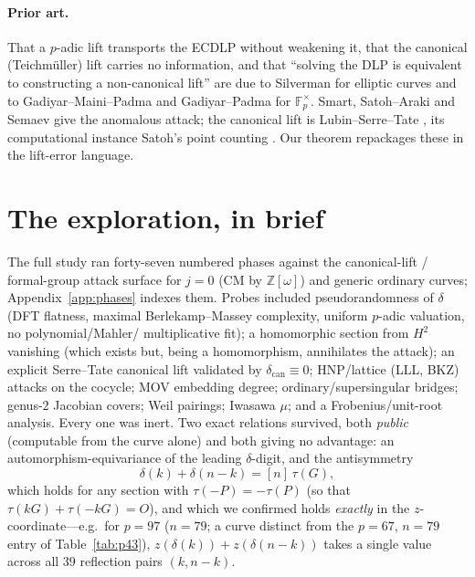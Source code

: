 \documentclass[11pt]{article}
\theoremstyle{definition}
\newcommand{\Fp}{\mathbb{F}_p}
\newcommand{\Z}{\mathbb{Z}}
\begin{document}
\paragraph{Prior art.} That a $p$-adic lift transports the ECDLP without
weakening it, that the canonical (Teichm\"uller) lift carries no
information, and that ``solving the DLP is equivalent to constructing a
non-canonical lift'' are due to Silverman \cite{silvermanlift,
silverman4faces} for elliptic curves and to Gadiyar--Maini--Padma and
Gadiyar--Padma \cite{gadiyarpadma} for $\Fp^\times$. Smart, Satoh--Araki
and Semaev \cite{smart,satoharaki,semaev} give the anomalous attack; the
canonical lift is Lubin--Serre--Tate \cite{lst}, its computational
instance Satoh's point counting \cite{satohcount}. Our theorem repackages
these in the lift-error language.

\section{The exploration, in brief}\label{sec:exploration}

The full study ran forty-seven numbered phases against the canonical-lift /
formal-group attack surface for $j=0$ (CM by $\Z[\omega]$) and generic
ordinary curves; Appendix~\ref{app:phases} indexes them. Probes included
pseudorandomness of $\delta$ (DFT flatness, maximal Berlekamp--Massey
complexity, uniform $p$-adic valuation, no polynomial/Mahler/%
multiplicative fit); a homomorphic section from $H^2$ vanishing (which
exists but, being a homomorphism, annihilates the attack); an explicit
Serre--Tate canonical lift validated by $\delta_{\mathrm{can}}\equiv 0$;
HNP/lattice (LLL, BKZ) attacks on the cocycle; MOV embedding degree;
ordinary/supersingular bridges; genus-$2$ Jacobian covers; Weil pairings;
Iwasawa $\mu$; and a Frobenius/unit-root analysis. Every one was inert.
Two exact relations survived, both \emph{public} (computable from the
curve alone) and both giving no advantage: an automorphism-equivariance
of the leading $\delta$-digit, and the antisymmetry
\begin{equation}\label{eq:antisym}
\delta(k)+\delta(n-k)=[n]\,\tau(G),
\end{equation}
which holds for any section with $\tau(-P)=-\tau(P)$ (so that
$\tau(kG)+\tau(-kG)=O$), and which we confirmed holds \emph{exactly} in
the $z$-coordinate---e.g.\ for $p=97$ ($n=79$; a curve distinct from the
$p=67$, $n=79$ entry of Table~\ref{tab:p43}),
$z(\delta(k))+z(\delta(n-k))$ takes a single value across all $39$
reflection pairs $(k,n-k)$.
\end{document}
